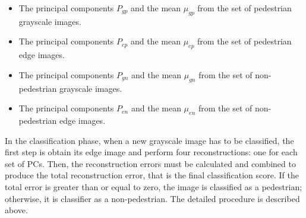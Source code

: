 \documentclass[10pt, conference, compsocconf]{IEEEtran}
\begin{document}
\begin{itemize}
	\item The principal components $P_{gp}$ and the mean $\mu_{gp}$ from the set of pedestrian grayscale images.
	\item The principal components $P_{ep}$ and the mean $\mu_{ep}$ from the set of pedestrian edge images.
	\item The principal components $P_{gn}$ and the mean $\mu_{gn}$ from the set of non-pedestrian grayscale images.
	\item The principal components $P_{en}$ and the mean $\mu_{en}$ from the set of non-pedestrian edge images.
\end{itemize}

In the classification phase, when a new grayscale image has to be classified, the first step is obtain its edge image and perform four reconstructions: one for each set of PCs. Then, the reconstruction errors must be calculated and combined to produce the total reconstruction error, that is the final classification score. If the total error is greater than or equal to zero, the image is classified as a pedestrian; otherwise, it is classifier as a non-pedestrian. The detailed procedure is described above.
\end{document}
